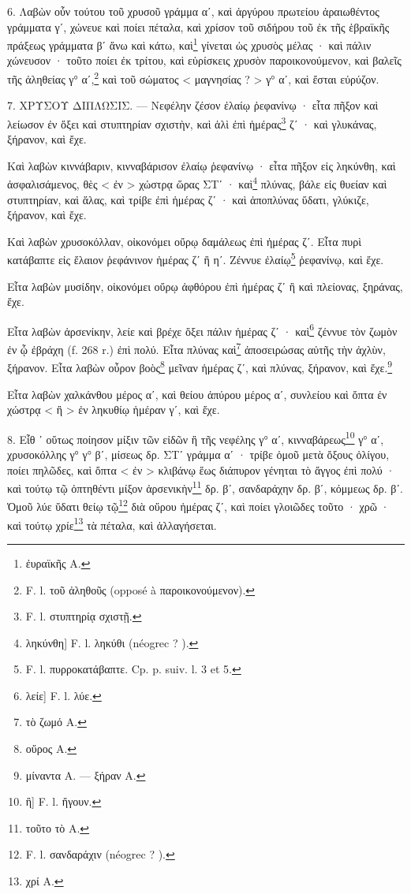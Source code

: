 \documentclass[a4paper, 11pt, oneside, polutonikogreek, french]{article}
\begin{document}
6. Λαβὼν οὖν τούτου τοῦ χρυσοῦ γράμμα αʹ, καὶ ἀργύρου πρωτείου ἀραιωθέντος γράμματα γʹ, χώνευε καὶ ποίει πέταλα, καὶ χρίσον τοῦ σιδήρου τοῦ ἐκ τῆς ἑβραϊκῆς πράξεως γράμματα βʹ ἄνω καὶ κάτω, καὶ\footnote{ἐυραϊκῆς A.} γίνεται ὡς χρυσὸς μέλας · καὶ πάλιν χώνευσον · τοῦτο ποίει ἐκ τρίτου, καὶ εὑρίσκεις χρυσὸν παροικονούμενον, καὶ βαλεῖς τῆς ἀληθείας γ° αʹ,\footnote{F. l. τοῦ ἀληθοῦς (opposé à παροικονούμενον).} καὶ τοῦ σώματος < μαγνησίας ? > γ° αʹ, καὶ ἔσται εὐρύζον.

7. ΧΡΥΣΟΥ ΔΙΠΛΩΣΙΣ. --- Νεφέλην ζέσον ἐλαίῳ ῥεφανίνῳ · εἶτα πῆξον καὶ λείωσον ἐν ὄξει καὶ στυπτηρίαν σχιστὴν, καὶ ἁλὶ ἐπὶ ἡμέρας\footnote{F. l. στυπτηρίᾳ σχιστῇ.} ζʹ · καὶ γλυκάνας, ξήρανον, καὶ ἔχε.

Καὶ λαβὼν κιννάβαριν, κινναβάρισον ἐλαίῳ ῥεφανίνῳ · εἶτα πῆξον εἰς ληκύνθη, καὶ ἀσφαλισάμενος, θὲς < ἐν > χώστρᾳ ὥρας ΣΤʹ · καὶ\footnote{ληκύνθη] F. l. ληκύθι (néogrec ? ).} πλύνας, βάλε εἰς θυείαν καὶ στυπτηρίαν, καὶ ἅλας, καὶ τρίβε ἐπὶ ἡμέρας ζʹ · καὶ ἀποπλύνας ὕδατι, γλύκιζε, ξήρανον, καὶ ἔχε.

Καὶ λαβὼν χρυσοκόλλαν, οἰκονόμει οὔρῳ δαμάλεως ἐπὶ ἡμέρας ζʹ. Εἶτα πυρὶ κατάβαπτε εἰς ἔλαιον ῥεφάνινον ἡμέρας ζʹ ἢ ηʹ. Ζέννυε ἐλαίῳ\footnote{F. l. πυρροκατάβαπτε. Cp. p. suiv. l. 3 et 5.} ῥεφανίνῳ, καὶ ἔχε.

Εἶτα λαβὼν μυσίδην, οἰκονόμει οὔρῳ ἀφθόρου ἐπὶ ἡμέρας ζʹ ἢ καὶ πλείονας, ξηράνας, ἔχε.

Εἶτα λαβὼν ἀρσενίκην, λείε καὶ βρέχε ὄξει πάλιν ἡμέρας ζʹ · καὶ\footnote{λείε] F. l. λύε.} ζέννυε τὸν ζωμὸν ἐν ᾧ ἐβράχη (f. 268 r.) ἐπὶ πολύ. Εἶτα πλύνας καὶ\footnote{τὸ ζωμό A.} ἀποσειρώσας αὐτῆς τὴν ἀχλὺν, ξήρανον. Εἶτα λαβὼν οὖρον βοὸς\footnote{οὔρος A.} μεῖναν ἡμέρας ζʹ, καὶ πλύνας, ξήρανον, καὶ ἔχε.\footnote{μίναντα A. --- ξήραν A.}

Εἶτα λαβὼν χαλκάνθου μέρος αʹ, καὶ θείου ἀπύρου μέρος αʹ, συνλείου καὶ ὄπτα ἐν χώστρᾳ < ἢ > ἐν ληκυθίῳ ἡμέραν γʹ, καὶ ἔχε.

8. Εἶθ ᾽ οὕτως ποίησον μίξιν τῶν εἰδῶν ἢ τῆς νεφέλης γ° αʹ, κινναβάρεως\footnote{ἢ] F. l. ἤγουν.} γ° αʹ, χρυσοκόλλης γ° γ° βʹ, μίσεως δρ. ΣΤʹ γράμμα αʹ · τρίβε ὁμοῦ μετὰ ὄξους ὀλίγου, ποίει πηλῶδες, καὶ ὄπτα < ἐν > κλιβάνῳ ἕως διάπυρον γένηται τὸ ἄγγος ἐπὶ πολύ · καὶ τούτῳ τῷ ὀπτηθέντι μίξον ἀρσενικὴν\footnote{τοῦτο τὸ A.} δρ. βʹ, σανδαράχην δρ. βʹ, κόμμεως δρ. βʹ. Ὁμοῦ λύε ὕδατι θείῳ τῷ\footnote{F. l. σανδαράχιν (néogrec ? ).} διὰ οὔρου ἡμέρας ζʹ, καὶ ποίει γλοιῶδες τοῦτο · χρῶ · καὶ τούτῳ χρίε\footnote{χρί A.} τὰ πέταλα, καὶ ἀλλαγήσεται.
\end{document}

